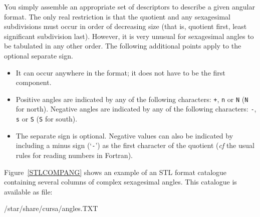 \documentclass[twoside,11pt]{starlink}
\begin{document}
You simply assemble an appropriate set of descriptors to describe a
given angular format.  The only real restriction is that the quotient
and any sexagesimal subdivisions must occur in order of decreasing size
(that is, quotient first, least significant subdivision last).  However,
it is very unusual for sexagesimal angles to be tabulated in any other
order.  The following additional points apply to the optional separate
sign.

\begin{itemize}

  \item It can occur anywhere in the format; it does not have to be
   the first component.

  \item Positive angles are indicated by any of the following
   characters: \texttt{+}, \texttt{n} or \texttt{N} (\texttt{N} for north).
   Negative angles are indicated by any of the following characters:
   \texttt{-}, \texttt{s} or \texttt{S} (\texttt{S} for south).

  \item The separate sign is optional.  Negative values can also be
   indicated by including a minus sign (`\texttt{-}') as the first
   character of the quotient (\textit{cf}\/ the usual rules for reading
   numbers in Fortran).

\end{itemize}

Figure~\ref{STLCOMPANG} shows an example of an STL format catalogue
containing several columns of complex sexagesimal angles.  This
catalogue is available as file:

\begin{terminalv}
/star/share/cursa/angles.TXT
\end{terminalv}
\end{document}
